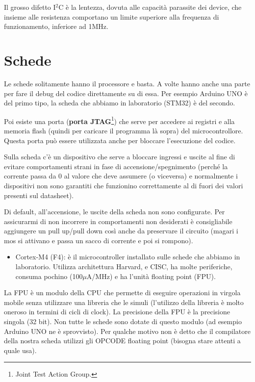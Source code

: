 \documentclass[
]{book}
\providecommand{\tightlist}{%
  \setlength{\itemsep}{0pt}\setlength{\parskip}{0pt}}
\begin{document}
Il grosso difetto I\(^2\)C è la lentezza, dovuta alle capacità parassite
dei device, che insieme alle resistenza comportano un limite superiore
alla frequenza di funzionamento, inferiore ad 1MHz.

\section{Schede}\label{schede}

Le schede solitamente hanno il processore e basta. A volte hanno anche
una parte per fare il debug del codice direttamente su di essa. Per
esempio Arduino UNO è del primo tipo, la scheda che abbiamo in
laboratorio (STM32) è del secondo.

Poi esiste una porta (\textbf{porta JTAG}\footnote{Joint Test Action
  Group.}) che serve per accedere ai registri e alla memoria flash
(quindi per caricare il programma là sopra) del microcontrollore. Questa
porta può essere utilizzata anche per bloccare l'esecuzione del codice.

Sulla scheda c'è un dispositivo che serve a bloccare ingressi e uscite
al fine di evitare comportamenti strani in fase di
accensione/spegnimento (perché la corrente passa da 0 al valore che deve
assumere (o viceversa) e normalmente i dispositivi non sono garantiti
che funzionino correttamente al di fuori dei valori presenti sul
datasheet).

Di default, all'accensione, le uscite della scheda non sono configurate.
Per assicurarmi di non incorrere in comportamenti non desiderati è
consigliabile aggiungere un pull up/pull down così anche da preservare
il circuito (magari i mos si attivano e passa un sacco di corrente e poi
si rompono).

\begin{itemize}
\tightlist
\item
  Cortex-M4 (F4): è il microcontroller installato sulle schede che
  abbiamo in laboratorio. Utilizza architettura Harvard, e CISC, ha
  molte periferiche, consuma pochino (100\(\mu\)A/MHz) e ha l'unità
  floating point (FPU).
\end{itemize}

La FPU è un modulo della CPU che permette di eseguire operazioni in
virgola mobile senza utilizzare una libreria che le simuli (l'utilizzo
della libreria è molto oneroso in termini di cicli di clock). La
precisione della FPU è la precisione singola (32 bit). Non tutte le
schede sono dotate di questo modulo (ad esempio Arduino UNO ne è
sprovvisto). Per qualche motivo non è detto che il compilatore della
nostra scheda utilizzi gli OPCODE floating point (bisogna stare attenti
a quale usa).
\end{document}
